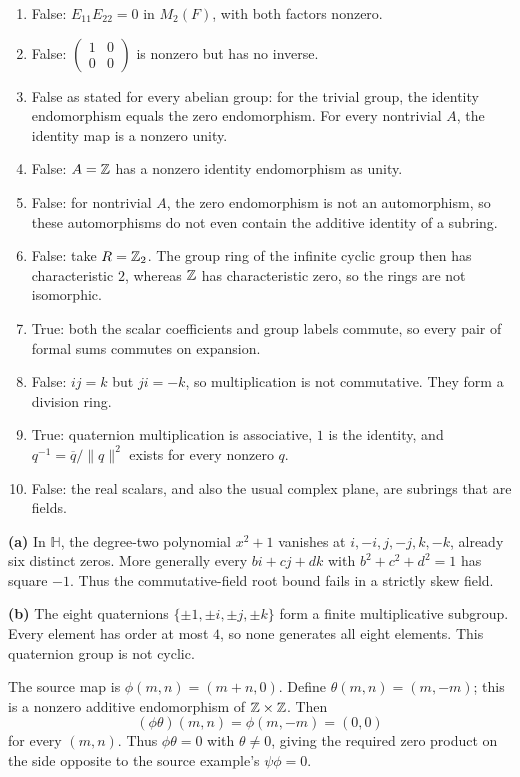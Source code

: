 \begin{enumerate}[label=(\alph*)]
\item False: $E_{11}E_{22}=0$ in $M_2(F)$, with both factors nonzero.
\item False: $\begin{pmatrix}1&0\\0&0\end{pmatrix}$ is nonzero but has no inverse.
\item False as stated for every abelian group: for the trivial group, the identity endomorphism equals the zero endomorphism. For every nontrivial $A$, the identity map is a nonzero unity.
\item False: $A=\mathbb{Z}$ has a nonzero identity endomorphism as unity.
\item False: for nontrivial $A$, the zero endomorphism is not an automorphism, so these automorphisms do not even contain the additive identity of a subring.
\item False: take $R=\mathbb{Z}_2$. The group ring of the infinite cyclic group then has characteristic $2$, whereas $\mathbb{Z}$ has characteristic zero, so the rings are not isomorphic.
\item True: both the scalar coefficients and group labels commute, so every pair of formal sums commutes on expansion.
\item False: $ij=k$ but $ji=-k$, so multiplication is not commutative. They form a division ring.
\item True: quaternion multiplication is associative, $1$ is the identity, and $q^{-1}=\overline q/\lVert q\rVert^2$ exists for every nonzero $q$.
\item False: the real scalars, and also the usual complex plane, are subrings that are fields.
\end{enumerate}

\textbf{(a)} In $\mathbb H$, the degree-two polynomial $x^2+1$ vanishes at $i,-i,j,-j,k,-k$, already six distinct zeros. More generally every $bi+cj+dk$ with $b^2+c^2+d^2=1$ has square $-1$. Thus the commutative-field root bound fails in a strictly skew field.\par
\textbf{(b)} The eight quaternions $\{\pm1,\pm i,\pm j,\pm k\}$ form a finite multiplicative subgroup. Every element has order at most $4$, so none generates all eight elements. This quaternion group is not cyclic.

The source map is $\phi(m,n)=(m+n,0)$. Define $\theta(m,n)=(m,-m)$; this is a nonzero additive endomorphism of $\mathbb{Z}\times\mathbb{Z}$. Then
\[(\phi\theta)(m,n)=\phi(m,-m)=(0,0)
\]
for every $(m,n)$. Thus $\phi\theta=0$ with $\theta\ne0$, giving the required zero product on the side opposite to the source example's $\psi\phi=0$.

